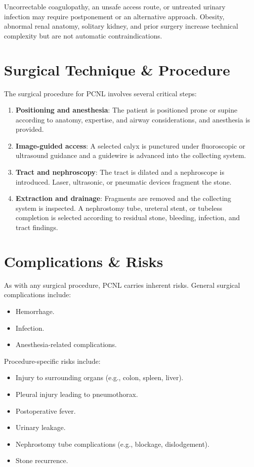 Uncorrectable coagulopathy, an unsafe access route, or untreated urinary infection may require postponement or an alternative approach. Obesity, abnormal renal anatomy, solitary kidney, and prior surgery increase technical complexity but are not automatic contraindications.

\section*{Surgical Technique \& Procedure}

The surgical procedure for PCNL involves several critical steps:

\begin{enumerate}
  \item \textbf{Positioning and anesthesia}: The patient is positioned prone or supine according to anatomy, expertise, and airway considerations, and anesthesia is provided.
  \item \textbf{Image-guided access}: A selected calyx is punctured under fluoroscopic or ultrasound guidance and a guidewire is advanced into the collecting system.
  \item \textbf{Tract and nephroscopy}: The tract is dilated and a nephroscope is introduced. Laser, ultrasonic, or pneumatic devices fragment the stone.
  \item \textbf{Extraction and drainage}: Fragments are removed and the collecting system is inspected. A nephrostomy tube, ureteral stent, or tubeless completion is selected according to residual stone, bleeding, infection, and tract findings.
\end{enumerate}

\section*{Complications \& Risks}

As with any surgical procedure, PCNL carries inherent risks. General surgical complications include:

\begin{itemize}
    \item Hemorrhage.
    \item Infection.
    \item Anesthesia-related complications.
\end{itemize}

Procedure-specific risks include:

\begin{itemize}
    \item Injury to surrounding organs (e.g., colon, spleen, liver).
    \item Pleural injury leading to pneumothorax.
    \item Postoperative fever.
    \item Urinary leakage.
    \item Nephrostomy tube complications (e.g., blockage, dislodgement).
    \item Stone recurrence.
\end{itemize}

